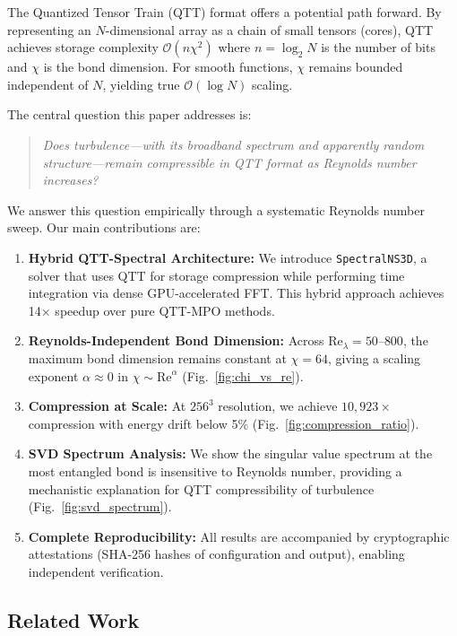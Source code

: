 \documentclass[preprint,12pt,authoryear]{elsarticle}
\newcommand{\bigO}{\mathcal{O}}
\theoremstyle{definition}
\begin{document}
The Quantized Tensor Train (QTT) format offers a potential path forward.
By representing an $N$-dimensional array as a chain of small tensors (cores), QTT achieves storage complexity $\bigO(n \chi^2)$ where $n = \log_2 N$ is the number of bits and $\chi$ is the bond dimension.
For smooth functions, $\chi$ remains bounded independent of $N$, yielding true $\bigO(\log N)$ scaling.

The central question this paper addresses is:
\begin{quote}
\emph{Does turbulence---with its broadband spectrum and apparently random structure---remain compressible in QTT format as Reynolds number increases?}
\end{quote}

We answer this question empirically through a systematic Reynolds number sweep.
Our main contributions are:

\begin{enumerate}
    \item \textbf{Hybrid QTT-Spectral Architecture:} We introduce \texttt{SpectralNS3D}, a solver that uses QTT for storage compression while performing time integration via dense GPU-accelerated FFT.  This hybrid approach achieves 14$\times$ speedup over pure QTT-MPO methods.
    
    \item \textbf{Reynolds-Independent Bond Dimension:} Across $\mathrm{Re}_\lambda = 50$--$800$, the maximum bond dimension remains constant at $\chi = 64$, giving a scaling exponent $\alpha \approx 0$ in $\chi \sim \mathrm{Re}^\alpha$ (Fig.~\ref{fig:chi_vs_re}).
    
    \item \textbf{Compression at Scale:} At $256^3$ resolution, we achieve $10{,}923\times$ compression with energy drift below 5\% (Fig.~\ref{fig:compression_ratio}).
    
    \item \textbf{SVD Spectrum Analysis:} We show the singular value spectrum at the most entangled bond is insensitive to Reynolds number, providing a mechanistic explanation for QTT compressibility of turbulence (Fig.~\ref{fig:svd_spectrum}).
    
    \item \textbf{Complete Reproducibility:} All results are accompanied by cryptographic attestations (SHA-256 hashes of configuration and output), enabling independent verification.
\end{enumerate}

\subsection{Related Work}
\end{document}

